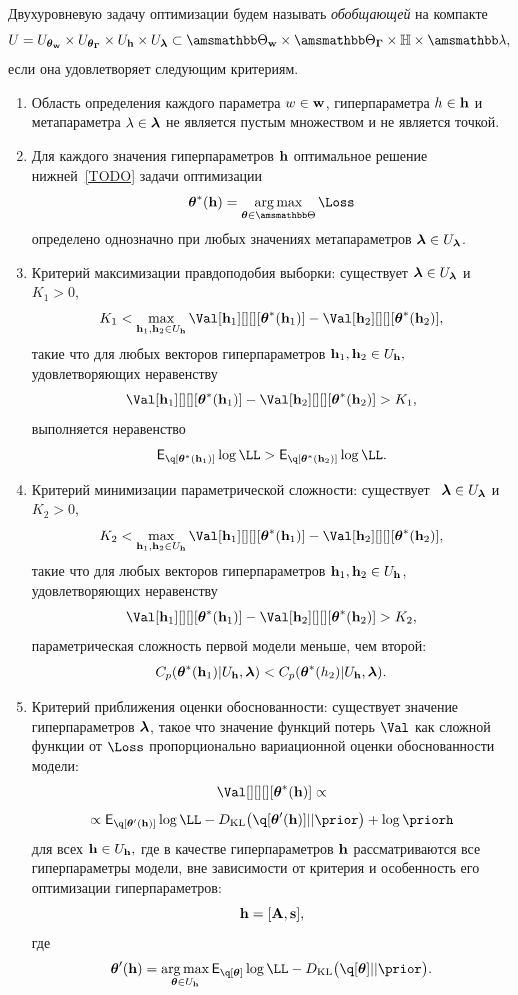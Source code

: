 \begin{defin}
Двухуровневую задачу оптимизации будем называть \textit{обобщающей} на компакте $$U = \Utetaw \times \UtetaG \times \Uh \times \Ulam \subset \Tetawb \times \TetaGb \times \Hb \times \Lamb,$$ если она удовлетворяет следующим критериям.
\begin{enumerate}
\item Область определения каждого параметра $w \in \mathbf{w}$, гиперпараметра $h \in \mathbf{h}$ и метапараметра $\lambda \in \boldsymbol{\lambda}$ не  является пустым множеством и не является точкой.
\item Для каждого значения гиперпараметров $\mathbf{h}$ оптимальное решение нижней~\eqref{TODO} задачи оптимизации 
\[
\teta^{*}(\h) = \argmax_{\teta \in \Tetab} \Loss
\]
определено однозначно при любых значениях метапараметров $\boldsymbol{\lambda} \in U_{\boldsymbol{\lambda}}$.

\item Критерий максимизации правдоподобия выборки: существует $\boldsymbol{\lambda} \in U_{\boldsymbol{\lambda}}$ и  $K_1>0$,$$K_1 < \max_{\h_1,\h_2 \in \Uh} \Val[\h_1][][][\teta^{*}(\h_1)] - \Val[\h_2][][][\teta^{*}(\h_2)],$$ такие что для любых векторов гиперпараметров $\mathbf{h}_1, \mathbf{h}_2 \in U_{\mathbf{h}},$ удовлетворяющих неравенству $$\Val[\h_1][][][\teta^{*}(\h_1)] - \Val[\h_2][][][\teta^{*}(\h_2)] > K_1,$$ выполняется неравенство $$\E_{\q[\teta^{*}(\h_1)]}\log\LL > \E_{\q[\teta^{*}(\h_2)]}\log\LL.$$

\item Критерий минимизации параметрической сложности:  существует  $\boldsymbol{\lambda} \in U_{\boldsymbol{\lambda}}$ и $K_2>0,$ $$K_2 < \max_{\h_1, \h_2 \in \Uh} \Val[\h_1][][][\teta^{*}(\h_1)] - \Val[\h_2][][][\teta^{*}(\h_2)],$$ такие что для любых векторов гиперпараметров $\mathbf{h}_1,\mathbf{h}_2 \in U_{\mathbf{h}}$, удовлетворяющих неравенству $$\Val[\h_1][][][\teta^{*}(\h_1)] - \Val[\h_2][][][\teta^{*}(\h_2)]>K_2,$$ параметрическая сложность первой модели меньше, чем второй: $$C_p(\boldsymbol{\theta}^{*}(\mathbf{h}_1)|U_{\mathbf{h}},\boldsymbol{\lambda})<C_p(\boldsymbol{\theta}^{*}(h_2)|U_{\mathbf{h}},\boldsymbol{\lambda}).$$

\item Критерий приближения оценки обоснованности: существует значение гиперпараметров $\boldsymbol{\lambda}$, такое что значение функций потерь $\Val$ как сложной функции от $\Loss$ пропорционально вариационной оценки обоснованности модели: $$\Val[][][][\teta^{*}(\h)] \propto $$
$$\propto
\E_{\q[\teta'(\h)]}\log\LL - \KL{\q[\teta'(\h)]}{\prior} + \log\priorh$$ для всех $\mathbf{h} \in U_{\mathbf{h}},$
где в качестве гиперпараметров $\mathbf{h}$ рассматриваются все гиперпараметры модели, вне зависимости от критерия и особенность его оптимизации гиперпараметров: $$\mathbf{h} = [\mathbf{A}, \mathbf{s}],$$
где $$\teta'(\h) = \argmax_{\teta \in \Uh} \E_{\q[\teta]}\log\LL - \KL{\q[\teta]}{\prior}.$$


\end{enumerate}
\end{defin}

